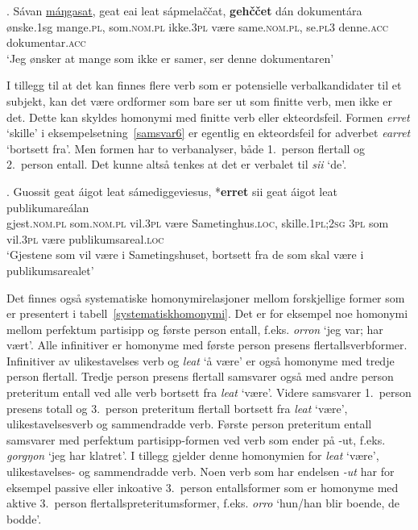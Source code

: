 \documentclass{flammie}
\begin{document}
\exg. Sávan \underline{máŋgasat}, geat eai leat sápmelaččat, \textbf{gehččet} dán dokumentára\label{samsvar5}\\
ønske\textit.{1sg} mange\textsc{.pl}, som\textsc{.nom.pl} ikke\textsc{.3pl} være same\textsc{.nom.pl}, se\textsc{.pl3} denne\textsc{.acc} dokumentar\textsc{.acc}\\
`Jeg ønsker at mange som ikke er samer, ser denne dokumentaren'

I tillegg til at det kan finnes flere verb som er potensielle verbalkandidater
til et subjekt, kan det være ordformer som bare ser ut som finitte verb, men
ikke er det. Dette kan skyldes homonymi med finitte verb eller ekteordsfeil.
Formen \textit{erret} `skille' i eksempelsetning~\ref{samsvar6} er egentlig en
ekteordsfeil for adverbet \textit{earret} `bortsett fra'. Men formen har to
verbanalyser, både 1.\ person flertall og 2.\ person entall. Det kunne altså
tenkes at det er verbalet til \textit{sii} `de'.

\exg. Guossit geat áigot leat sámediggeviesus, *\textbf{erret} sii geat áigot leat publikumareálan\label{samsvar6}\\
gjest\textsc{.nom.pl} som\textsc{.nom.pl} vil\textsc{.3pl} være Sametinghus\textsc{.loc}, skille\textsc{.1pl;2sg} \textsc{3pl} som vil\textsc{.3pl} være publikumsareal\textsc{.loc}\\
`Gjestene som vil være i Sametingshuset, bortsett fra de som skal være i publikumsarealet'

Det finnes også systematiske homonymirelasjoner mellom forskjellige former som
er presentert i tabell~\ref{systematiskhomonymi}.  Det er for eksempel noe
homonymi mellom perfektum partisipp og første person entall, f.eks.
\textit{orron} `jeg var; har vært'.  Alle infinitiver er homonyme med første
person presens flertallsverbformer. Infinitiver av ulikestavelses verb og
\textit{leat} `å være' er også homonyme med tredje person flertall.  Tredje
person presens flertall samsvarer også med andre person preteritum entall ved
alle verb bortsett fra \textit{leat} `være'.  Videre samsvarer 1.\ person
presens totall og 3.\ person preteritum flertall bortsett fra \textit{leat}
`være', ulikestavelsesverb og sammendradde verb.  Første person preteritum
entall samsvarer med perfektum partisipp-formen ved verb som ender på -ut,
f.eks.  \textit{gorgŋon} `jeg har klatret'.  I tillegg gjelder denne homonymien
for \textit{leat} `være', ulikestavelses- og sammendradde verb.  Noen verb som
har endelsen \textit{-ut} har for eksempel passive eller inkoative 3.\ person
entallsformer som er homonyme med aktive 3.\ person flertallspreteritumsformer,
f.eks. \textit{orro} `hun/han blir boende, de bodde'.
\end{document}
